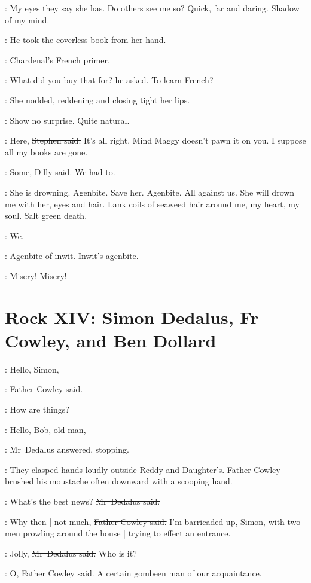 \StephenInt:
My eyes they say she has.
Do others see me so?
Quick, far and daring.
Shadow of my mind.

:
He took the coverless book from her hand.

\StephenInt:
Chardenal's French primer.

\Stephen:
What did you buy that for?
\sout{he asked.}
To learn French?

:
She nodded,%
reddening and closing tight her lips.

\StephenInt:
Show no surprise.
Quite natural.

\Stephen:
Here,
\sout{Stephen said.}
It's all right.
Mind Maggy doesn't pawn it on you.
I suppose all my books are gone.

\dilly:
Some,
\sout{Dilly said.}
We had to.

\StephenInt:
She is drowning.
Agenbite.
Save her.
Agenbite.
All against us.
She will drown me with her,
eyes and hair.
Lank coils of seaweed hair around me,
my heart,
my soul.
Salt green death.

\StephenInt:
We.

\StephenInt:
Agenbite of inwit.
Inwit's agenbite.

\StephenInt:
Misery!%
Misery!


\section*{Rock XIV: Simon Dedalus, Fr Cowley, and Ben Dollard}


\cowley:
Hello, Simon,

:
Father Cowley said.

\cowley:
How are things?

\simon:
Hello, Bob, old man,

:
Mr~Dedalus answered,
stopping.

:
They clasped hands loudly outside Reddy and Daughter's.
Father Cowley brushed his moustache often downward
with a scooping hand.

\simon:
What's the best news?
\sout{Mr~Dedalus said.}

\cowley:
Why then |
not much,
\sout{Father Cowley said.}
I'm barricaded up, Simon,
with two men prowling around the house |
trying to effect an entrance.

\simon:
Jolly,
\sout{Mr~Dedalus said.}
Who is it?

\cowley:
O,
\sout{Father Cowley said.}%
A certain gombeen man of our acquaintance.

